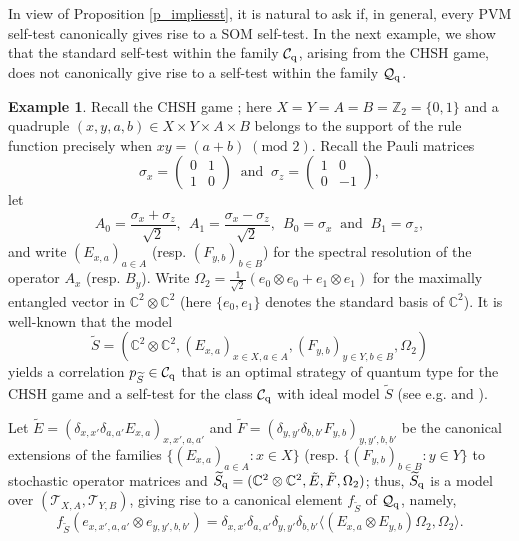 \documentclass[11pt]{amsart}
\theoremstyle{definition}
\newtheorem{example}[theorem]{Example}
\newcommand{\cl}[1]{\mathcal{#1}}
\newcommand{\bb}[1]{\mathbb{#1}}
\providecommand{\wt}[1]{\widetilde{#1}}
\begin{document}
In view of Proposition \ref{p_impliesst}, it is natural to ask 
if, in general, every PVM self-test canonically gives rise to a 
SOM self-test. In the next example, we show that 
the standard self-test within the family 
$\cl C_{\rm q}$, arising from the CHSH game, does not canonically give 
rise to a self-test within the family $\cl Q_{\rm q}$. 

\begin{example}\label{CHSH_Cq_Qq}
\rm 
Recall the CHSH game \cite{chsh}; here $X=Y=A=B={\mathbb Z}_2=\{0,1\}$ 
and a quadruple $(x,y,a,b) \in X\times Y \times A\times B$ 
belongs to the support of the rule function precisely when
$xy=(a+b)\;(\text{mod } 2)$. 
Recall the Pauli matrices 
$$\sigma_x=\left(\begin{array}{cc}0&1\\1&0\end{array}\right) 
\ \mbox{ and } \ \sigma_z=\left(\begin{array}{cc}1&0\\0&-1\end{array}\right),$$
let 
$$A_0=\frac{\sigma_x+\sigma_z}{\sqrt{2}}, \ \ A_1=\frac{\sigma_x-\sigma_z}{\sqrt{2}}, \ \
B_0=\sigma_x \ \mbox{ and } \ B_1=\sigma_z,$$  
and write $(E_{x,a})_{a\in A}$ (resp. $(F_{y,b})_{b\in B}$) 
for the spectral resolution of the operator $A_x$ (resp. $B_y$). 
Write $\Omega_2=\frac{1}{\sqrt{2}}(e_0\otimes e_0+e_1\otimes e_1)$ for the maximally entangled vector in $\bb{C}^2\otimes \bb{C}^2$
(here 
$\{e_0,e_1\}$ denotes the standard basis of $\mathbb C^2$). 
It is well-known that the model 
\begin{equation}\label{eq_optimmoSt}
\wt{S} = (\mathbb C^2\otimes\mathbb C^2, (E_{x,a})_{x\in X,a\in A}, (F_{y,b})_{y\in Y,b\in B}, \Omega_2)
\end{equation}
yields a correlation $p_{\wt{S}}\in \cl C_{\rm q}$ that is 
an optimal strategy of quantum type for the CHSH game and a self-test for the class 
$\cl C_{\rm q}$ with ideal model $\tilde S$ (see e.g. \cite{supic-bowles}
and \cite{mps}).  

Let $\tilde{E} =(\delta_{x,x'}\delta_{a,a'}E_{x,a})_{x,x',a,a'}$ and 
$\tilde{F} = (\delta_{y,y'}\delta_{b,b'}F_{y,b})_{y,y',b,b'}$ be the canonical extensions of the families $\{(E_{x,a})_{a\in A} : x \in X\}$ 
(resp. $\{(F_{y,b})_{b\in B} : y\in Y\}$ to stochastic operator matrices and 
$\wt{S}_{\rm q} = (\mathbb C^2\otimes\mathbb C^2, \tilde{E}, \tilde{F}, \Omega_2)$; 
thus, $\wt{S}_{\rm q}$ is a model over $(\cl T_{X,A},\cl T_{Y,B})$, 
giving rise to a canonical element $f_{\wt{S}}$ of $\cl Q_{\rm q}$, 
namely, 
$$f_{\wt{S}}(e_{x,x',a,a'}\otimes e_{y,y',b,b'})=\delta_{x,x'}\delta_{a,a'}\delta_{y,y'}\delta_{b,b'}\langle (E_{x,a}\otimes E_{y,b})\Omega_2,\Omega_2\rangle.$$


\end{example}
\end{document}
